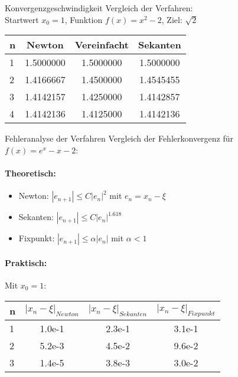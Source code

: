 \begin{example2}{Konvergenzgeschwindigkeit} Vergleich der Verfahren:
    \vspace{1mm}\\
    Startwert $x_0 = 1$, Funktion $f(x) = x^2 - 2$, Ziel: $\sqrt{2}$
    \begin{center}
    \begin{tabular}{l|c|c|c}
    n & Newton & Vereinfacht & Sekanten \\\hline
    1 & 1.5000000 & 1.5000000 & 1.5000000\\
    2 & 1.4166667 & 1.4500000 & 1.4545455\\
    3 & 1.4142157 & 1.4250000 & 1.4142857\\
    4 & 1.4142136 & 1.4125000 & 1.4142136
    \end{tabular}
    \end{center}
\end{example2}



\begin{example2}{Fehleranalyse der Verfahren}
Vergleich der Fehlerkonvergenz für $f(x) = e^x - x - 2$:

\paragraph{Theoretisch:}
\begin{itemize}
    \item Newton: $|e_{n+1}| \leq C|e_n|^2$ mit $e_n = x_n - \xi$
    \item Sekanten: $|e_{n+1}| \leq C|e_n|^{1.618}$
    \item Fixpunkt: $|e_{n+1}| \leq \alpha|e_n|$ mit $\alpha < 1$
\end{itemize}

\paragraph{Praktisch:} Mit $x_0 = 1$:
\begin{center}
\begin{tabular}{l|c|c|c}
n & $|x_n-\xi|_{Newton}$ & $|x_n-\xi|_{Sekanten}$ & $|x_n-\xi|_{Fixpunkt}$ \\\hline
1 & 1.0e-1 & 2.3e-1 & 3.1e-1 \\
2 & 5.2e-3 & 4.5e-2 & 9.6e-2 \\
3 & 1.4e-5 & 3.8e-3 & 3.0e-2
\end{tabular}
\end{center}
\end{example2}

